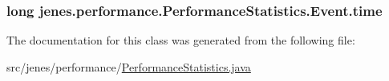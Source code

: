 \hypertarget{classjenes_1_1performance_1_1_performance_statistics_1_1_event_ab5ebdfbbc9a6e1f9d770bae3b18f6f85}{
\subsubsection[{time}]{\setlength{\rightskip}{0pt plus 5cm}long jenes.\-performance.\-Performance\-Statistics.\-Event.\-time}}\label{classjenes_1_1performance_1_1_performance_statistics_1_1_event_ab5ebdfbbc9a6e1f9d770bae3b18f6f85}


The documentation for this class was generated from the following file\-:\begin{DoxyCompactItemize}
\item 
src/jenes/performance/\hyperlink{_performance_statistics_8java}{Performance\-Statistics.\-java}\end{DoxyCompactItemize}

